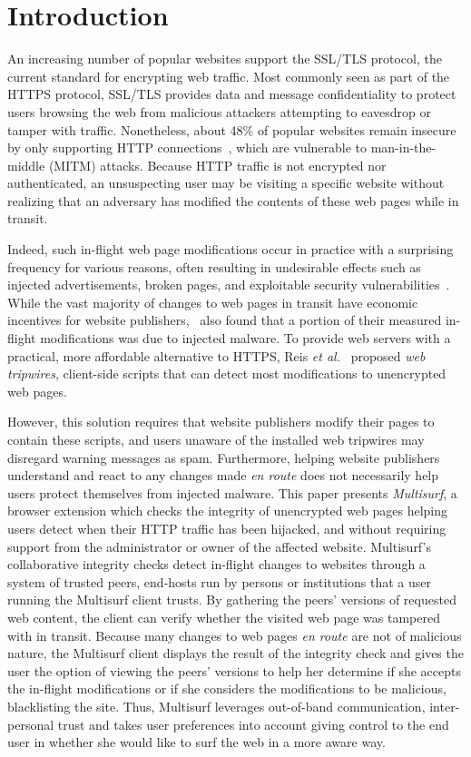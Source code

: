 \section{Introduction}
\label{sec:intro}

An increasing number of popular websites support the SSL/TLS protocol, the current standard for encrypting web traffic.
Most commonly seen as part of the HTTPS protocol, SSL/TLS provides data and message confidentiality to protect users browsing the web from malicious attackers attempting to eavesdrop or tamper with traffic. 
Nonetheless, about 48\% of popular websites remain insecure by only supporting HTTP connections~\cite{sslpulse}, which are vulnerable to man-in-the-middle (MITM) attacks.
Because HTTP traffic is not encrypted nor authenticated, an unsuspecting user may be visiting a specific website without realizing that an adversary has modified the contents of these web pages while in transit.

Indeed, such in-flight web page modifications occur in practice with a surprising frequency for various reasons, often resulting in undesirable effects such as injected advertisements, broken pages, and exploitable security vulnerabilities~\cite{tripwires}. 
While the vast majority of changes to web pages in transit have economic incentives for website publishers,~\cite{tripwires} also found that a portion of their measured in-flight modifications was due to injected malware.
To provide web servers with a practical, more affordable alternative to HTTPS, Reis \emph{et al.}~\cite{tripwires} proposed \emph{web tripwires}, client-side scripts that can detect most modifications to unencrypted web pages.

However, this solution requires that website publishers modify their pages to contain these scripts, and users unaware of the installed web tripwires may disregard warning messages as spam.
Furthermore, helping website publishers understand and react to any changes made \emph{en route} does not necessarily help users protect themselves from injected malware.
This paper presents \emph{Multisurf}, a browser extension which checks the integrity of unencrypted web pages helping users detect when their HTTP traffic has been hijacked, and without requiring support from the administrator or owner of the affected website. 
Multisurf's collaborative integrity checks detect in-flight changes to websites through a system of trusted peers, end-hosts run by persons or institutions that a user running the Multisurf client trusts. 
By gathering the peers' versions of requested web content, the client can verify whether the visited web page was tampered with in transit.
Because many changes to web pages \emph{en route} are not of malicious nature, the Multisurf client displays the result of the integrity check and gives the user the option of viewing the peers' versions to help her determine if she accepts the in-flight modifications or if she considers the modifications to be malicious, blacklisting the site. 
Thus, Multisurf leverages out-of-band communication, inter-personal trust and takes user preferences into account giving control to the end user in whether she would like to surf the web in a more aware way.

